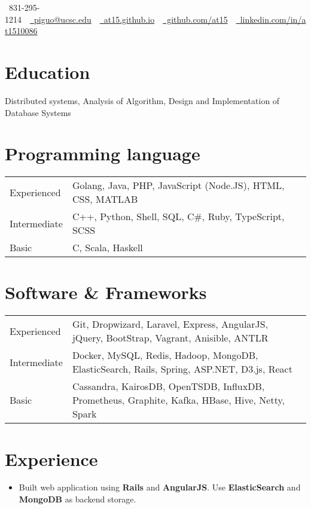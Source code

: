 \documentclass[10pt, letterpaper]{simple-cv}
\begin{document}
\centerline{\faMobile\ 831-295-1214\ \
\href{mailto:piguo@ucsc.edu}{\faEnvelope\ piguo@ucsc.edu}\ \
\href{https://at15.github.io}{\faHome\ at15.github.io}\ \
\href{https://github.com/at15}{\faGithubSquare\ github.com/at15}\ \
\href{https://www.linkedin.com/in/at1510086}{\faLinkedinSquare\ linkedin.com/in/at1510086}}

\section{Education}
Distributed systems, Analysis of Algorithm, Design and Implementation of Database Systems

\section{Programming language}
\begin{tabular}{ l l }
 Experienced &  Golang, Java, PHP, JavaScript (Node.JS), HTML, CSS, MATLAB \\
 Intermediate & C++, Python, Shell, SQL, C\#, Ruby, TypeScript, SCSS \\
 Basic & C, Scala, Haskell
\end{tabular}

\section{Software \& Frameworks}
\begin{tabular}{ l l }
 Experienced & Git, Dropwizard, Laravel, Express, AngularJS, jQuery, BootStrap, Vagrant, Anisible, ANTLR\\
 Intermediate & Docker, MySQL, Redis, Hadoop, MongoDB, ElasticSearch, Rails, Spring, ASP.NET, D3.js, React \\
 Basic & Cassandra, KairosDB, OpenTSDB, InfluxDB, Prometheus, Graphite, Kafka, HBase, Hive, Netty, Spark
\end{tabular}

\section{Experience}

\begin{itemize}
\item Built web application using \textbf{Rails} and \textbf{AngularJS}. Use \textbf{ElasticSearch} and \textbf{MongoDB} as backend storage.
\end{itemize}
\end{document}

